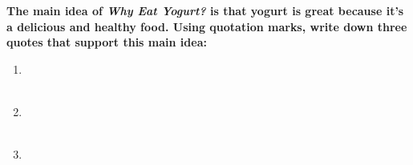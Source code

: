 \documentclass[12pt]{article}
\begin{document}
\vspace{1em}
\begin{tcolorbox}[colframe=black!60, colback=white, 
coltitle=black, colbacktitle=black!15, fonttitle=\bfseries\Large, 
title=Guided Practice, halign title=center, left=10pt, right=10pt, top=10pt, bottom=15pt]
\textbf{The main idea of \textit{Why Eat Yogurt?} is that yogurt is great because it's a delicious and healthy food. Using quotation marks, write down three quotes that support this main idea:} 
\vspace{1cm}
\begin{enumerate}[itemsep=4em] %
    \item \underline{\hspace{15cm}}  
    \\[0.8cm] \underline{\hspace{15cm}}  
    \\[0.8cm] \underline{\hspace{15cm}} 
    \item \underline{\hspace{15cm}}  
    \\[0.8cm] \underline{\hspace{15cm}}  
    \\[0.8cm] \underline{\hspace{15cm}} 
    \item 
    \underline{\hspace{15cm}}  
    \\[0.8cm] \underline{\hspace{15cm}}  
    \\[0.8cm] \underline{\hspace{15cm}}



\end{enumerate}
\vspace{2em}
\end{tcolorbox}

\vspace{.5em}
\end{document}
